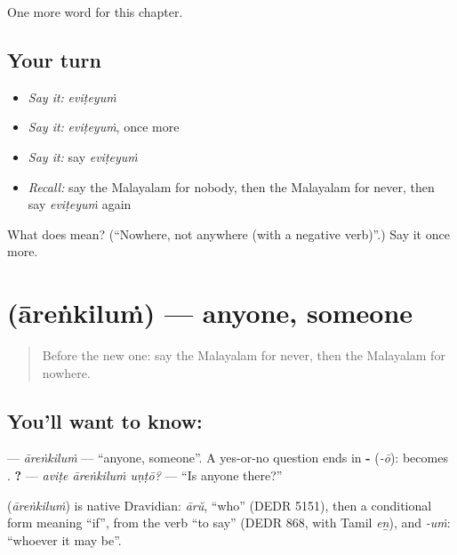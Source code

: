\begin{grammarlens}[title={What you've built}]
One more word for this chapter.
\end{grammarlens}

\subsection*{Your turn}
\begin{itemize}
\raggedright
  \item \emph{Say it:} \emph{eviṭeyuṁ}
  \item \emph{Say it:} \emph{eviṭeyuṁ}, once more
  \item \emph{Say it:} say \emph{eviṭeyuṁ}
  \item \emph{Recall:} say the Malayalam for nobody, then the Malayalam for never, then say \emph{eviṭeyuṁ} again
\end{itemize}

\begin{tcolorbox}[breakable,colback=teal!4,colframe=teal!35!black,title={Before you move on}]
What does  mean? (\textquotedblleft{}Nowhere, not anywhere (with a negative verb)\textquotedblright{}.) Say it once more.
\end{tcolorbox}
\section[\texorpdfstring{\ml{ആരെങ്കിലും} (āreṅkiluṁ)}{ആരെങ്കിലും (āreṅkiluṁ)}]{ (āreṅkiluṁ) — anyone, someone}

\label{lesson:ML-C177-arenkilum}



\begin{quote}
Before the new one: say the Malayalam for never, then the Malayalam for nowhere.
\end{quote}

\subsection*{You'll want to know: }
\textbf{} — \emph{āreṅkiluṁ} — \textquotedblleft{}anyone, someone\textquotedblright{}. A yes-or-no question ends in \textbf{-} (\emph{-ō}): \textbf{} becomes \textbf{}. \textbf{  ?} — \emph{aviṭe āreṅkiluṁ uṇṭō?} — \textquotedblleft{}Is anyone there?\textquotedblright{}

\begin{cousinweb}
\textbf{} (\emph{āreṅkiluṁ}) is native Dravidian: \emph{ārŭ}, \textquotedblleft{}who\textquotedblright{} (DEDR 5151), then a conditional form meaning \textquotedblleft{}if\textquotedblright{}, from the verb \textquotedblleft{}to say\textquotedblright{} (DEDR 868, with Tamil \emph{eṉ}), and \emph{-uṁ}: \textquotedblleft{}whoever it may be\textquotedblright{}.
\end{cousinweb}

